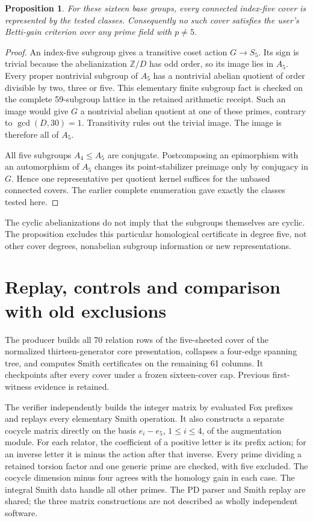 \documentclass[11pt]{article}
\newtheorem{proposition}[theorem]{Proposition}
\newcommand{\Z}{\mathbb Z}
\begin{document}
\begin{proposition}\label{prop:allfive}
For these sixteen base groups, every connected index-five cover is
represented by the tested classes. Consequently no such cover
satisfies the user's Betti-gain criterion over any prime field with
$p\ne5$.
\end{proposition}
\begin{proof}
An index-five subgroup gives a transitive coset action $G\to S_5$.
Its sign is trivial because the abelianization $\Z/D$ has odd order,
so its image lies in $A_5$. Every proper nontrivial subgroup of
$A_5$ has a nontrivial abelian quotient of order divisible by two,
three or five. This elementary finite subgroup fact is checked on
the complete 59-subgroup lattice in the retained arithmetic receipt.
Such an image would give $G$ a nontrivial abelian quotient at one
of these primes, contrary to $\gcd(D,30)=1$. Transitivity rules out
the trivial image. The image is therefore all of $A_5$.

All five subgroups $A_4\le A_5$ are conjugate. Postcomposing an
epimorphism with an automorphism of $A_5$ changes its point-stabilizer
preimage only by conjugacy in $G$. Hence one representative per
quotient kernel suffices for the unbased connected covers. The
earlier complete enumeration gave exactly the classes tested here.
\end{proof}

The cyclic abelianizations do not imply that the subgroups themselves
are cyclic. The proposition excludes this particular homological
certificate in degree five, not other cover degrees, nonabelian
subgroup information or new representations.

\section{Replay, controls and comparison with old exclusions}

The producer builds all 70 relation rows of the five-sheeted cover
of the normalized thirteen-generator core presentation, collapses a
four-edge spanning tree, and computes Smith certificates on the
remaining 61 columns. It checkpoints after every cover under a frozen
sixteen-cover cap. Previous first-witness evidence is retained.

The verifier independently builds the integer matrix by evaluated
Fox prefixes and replays every elementary Smith operation. It also
constructs a separate cocycle matrix directly on the basis
$e_i-e_5$, $1\le i\le4$, of the augmentation module. For each
relator, the coefficient of a positive letter is its prefix action;
for an inverse letter it is minus the action after that inverse.
Every prime dividing a retained torsion factor and one generic
prime are checked, with five excluded. The cocycle dimension minus
four agrees with the homology gain in each case. The integral Smith
data handle all other primes. The PD parser and Smith replay are
shared; the three matrix constructions are not described as wholly
independent software.
\end{document}

